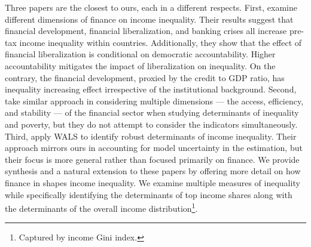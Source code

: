 \begin{refsection}
Three papers are the closest to ours, each in a different respects. First, \textcite{de2017finance} examine different dimensions of finance on income inequality. Their results suggest that financial development, financial liberalization, and banking crises all increase pre-tax income inequality within countries. Additionally, they show that the effect of financial liberalization is conditional on democratic accountability. Higher accountability mitigates the impact of liberalization on inequality. On the contrary, the financial development, proxied by the credit to GDP ratio, has inequality increasing effect irrespective of the institutional background. Second, \textcite{naceurzhang2016} take similar approach in considering multiple dimensions --- the access, efficiency, and stability --- of the financial sector when studying determinants of inequality and poverty, but they do not attempt to consider the indicators simultaneously.  Third, \textcite{furceri2019robust} apply \ac{WALS} to identify robust determinants of income inequality. Their approach mirrors ours in accounting for model uncertainty in the estimation, but their focus is more general rather than focused primarily on finance. We provide synthesis and a natural extension to these papers by offering more detail on how finance in shapes income inequality. We examine multiple measures of inequality while specifically identifying the determinants of top income shares along with the determinants of the overall income distribution\footnote{Captured by income Gini index.}.




\end{refsection}

